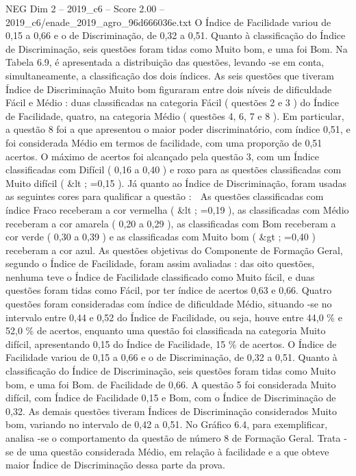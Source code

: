 \begin{textsample}{NEG Dim 2 – 2019\_c6 – Score 2.00 – 2019\_c6/enade\_2019\_agro\_96d666036e.txt}
O Índice de Facilidade variou de 0,15 a 0,66 e o de Discriminação, de 0,32 a 0,51.
Quanto à classificação do Índice de Discriminação, seis questões foram tidas como Muito bom, e uma foi Bom.
Na Tabela 6.9, é apresentada a distribuição das questões, levando -se em conta, simultaneamente, a classificação dos dois índices.
As seis questões que tiveram Índice de Discriminação Muito bom figuraram entre dois níveis de dificuldade Fácil e Médio : duas classificadas na categoria Fácil ( questões 2 e 3 ) do Índice de Facilidade, quatro, na categoria Médio ( questões 4, 6, 7 e 8 ).
Em particular, a questão 8 foi a que apresentou o maior poder discriminatório, com índice 0,51, e foi considerada Médio em termos de facilidade, com uma proporção de 0,51 acertos.
O máximo de acertos foi alcançado pela questão 3, com um Índice classificadas com Difícil ( 0,16 a 0,40 ) e roxo para as questões classificadas com Muito difícil ( \&lt ; =0,15 ).
Já quanto ao Índice de Discriminação, foram usadas as seguintes cores para qualificar a questão :  As questões classificadas com índice Fraco receberam a cor vermelha ( \&lt ; =0,19 ), as classificadas com Médio receberam a cor amarela ( 0,20 a 0,29 ), as classificadas com Bom receberam a cor verde ( 0,30 a 0,39 ) e as classificadas com Muito bom ( \&gt ; =0,40 ) receberam a cor azul.
As questões objetivas do Componente de Formação Geral, segundo o Índice de Facilidade, foram assim avaliadas : das oito questões, nenhuma teve o Índice de Facilidade classificado como Muito fácil, e duas questões foram tidas como Fácil, por ter índice de acertos 0,63 e 0,66.
Quatro questões foram consideradas com índice de dificuldade Médio, situando -se no intervalo entre 0,44 e 0,52 do Índice de Facilidade, ou seja, houve entre 44,0 \% e 52,0 \% de acertos, enquanto uma questão foi classificada na categoria Muito difícil, apresentando 0,15 do Índice de Facilidade, 15 \% de acertos.
O Índice de Facilidade variou de 0,15 a 0,66 e o de Discriminação, de 0,32 a 0,51.
Quanto à classificação do Índice de Discriminação, seis questões foram tidas como Muito bom, e uma foi Bom. de Facilidade de 0,66.
A questão 5 foi considerada Muito difícil, com Índice de Facilidade 0,15 e Bom, com o Índice de Discriminação de 0,32.
As demais questões tiveram Índices de Discriminação considerados Muito bom, variando no intervalo de 0,42 a 0,51.
No Gráfico 6.4, para exemplificar, analisa -se o comportamento da questão de número 8 de Formação Geral.
Trata -se de uma questão considerada Médio, em relação à facilidade e a que obteve maior Índice de Discriminação dessa parte da prova.

\end{textsample}
